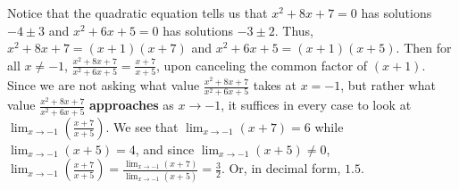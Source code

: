 \documentclass{ximera}
\begin{document}
\begin{exercise}
\begin{hint}
     Notice that the quadratic equation tells us that $x^2+8x+7=0$ has solutions $-4\pm3$ and $x^2+6x+5=0$ has solutions $-3\pm{2}$. Thus, $x^2+8x+7=\left(x+1\right)\left(x+7\right)$ and $x^2+6x+5=\left(x+1\right)\left(x+5\right)$. Then for all $x\ne-1$, $\frac{x^2+8x+7}{x^2+6x+5}=\frac{x+7}{x+5}$, upon canceling the common factor of $\left({x+1}\right)$. Since we are not asking what value $\frac{x^2+8x+7}{x^2+6x+5}$ takes at $x=-1$, but rather what value $\frac{x^2+8x+7}{x^2+6x+5}$ \textbf{approaches} as $x\to-1$, it suffices in every case to look at $\lim_{x\to-1}\left({\frac{x+7}{x+5}}\right)$. We see that $\lim_{x\to-1}\left({x+7}\right)=6$ while $\lim_{x\to-1}\left({x+5}\right)=4$, and since $\lim_{x\to-1}\left({x+5}\right)\ne0$, $\lim_{x\to-1}\left({\frac{x+7}{x+5}}\right)=\frac{\lim_{x\to-1}\left({x+7}\right)}{\lim_{x\to-1}\left({x+5}\right)}=\frac{3}{2}$. Or, in decimal form, $1.5$.
    \end{hint}
\end{exercise}
\end{document}
